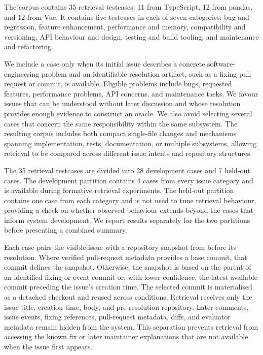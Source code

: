The corpus contains 35 retrieval testcases: 11 from TypeScript, 12 from pandas, and 12 from Vue. It contains five testcases in each of seven categories: bug and regression, feature enhancement, performance and memory, compatibility and versioning, API behaviour and design, testing and build tooling, and maintenance and refactoring.

We include a case only when its initial issue describes a concrete software-engineering problem and an identifiable resolution artifact, such as a fixing pull request or commit, is available. Eligible problems include bugs, requested features, performance problems, API concerns, and maintenance tasks. We favour issues that can be understood without later discussion and whose resolution provides enough evidence to construct an oracle. We also avoid selecting several cases that concern the same responsibility within the same subsystem. The resulting corpus includes both compact single-file changes and mechanisms spanning implementation, tests, documentation, or multiple subsystems, allowing retrieval to be compared across different issue intents and repository structures.

The 35 retrieval testcases are divided into 28 development cases and 7 held-out cases. The development partition contains 4 cases from every issue category and is available during formative retrieval experiments. The held-out partition contains one case from each category and is not used to tune retrieval behaviour, providing a check on whether observed behaviour extends beyond the cases that inform system development. We report results separately for the two partitions before presenting a combined summary.

Each case pairs the visible issue with a repository snapshot from before its resolution. Where verified pull-request metadata provides a base commit, that commit defines the snapshot. Otherwise, the snapshot is based on the parent of an identified fixing or event commit or, with lower confidence, the latest available commit preceding the issue's creation time. The selected commit is materialised as a detached checkout and reused across conditions. Retrieval receives only the issue title, creation time, body, and pre-resolution repository. Later comments, issue events, fixing references, pull-request metadata, diffs, and evaluator metadata remain hidden from the system. This separation prevents retrieval from accessing the known fix or later maintainer explanations that are not available when the issue first appears.

